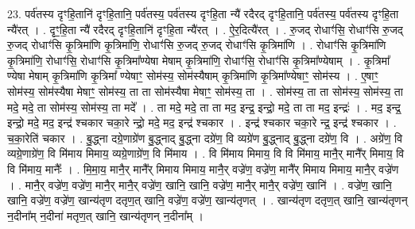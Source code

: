 \documentclass[17pt]{extarticle}
\begin{document}
23. पर्व॑तस्य दृꣳहि॒तानि॑ दृꣳहि॒तानि॒ पर्व॑तस्य॒ पर्व॑तस्य दृꣳहि॒ता न्यै॑ रदैरद् दृꣳहि॒तानि॒ पर्व॑तस्य॒ पर्व॑तस्य दृꣳहि॒ता न्यै॑रत् । . दृꣳ॒॒हि॒ता न्यै॑ रदैरद् दृꣳहि॒तानि॑ दृꣳहि॒ता न्यै॑रत् । . ऐ॒र॒दित्यै॑रत् । . रु॒जद् रोधाꣳ॑सि॒ रोधाꣳ॑सि रु॒जद् रु॒जद् रोधाꣳ॑सि कृ॒त्रिमा॑णि कृ॒त्रिमा॑णि॒ रोधाꣳ॑सि रु॒जद् रु॒जद् रोधाꣳ॑सि कृ॒त्रिमा॑णि । . रोधाꣳ॑सि कृ॒त्रिमा॑णि कृ॒त्रिमा॑णि॒ रोधाꣳ॑सि॒ रोधाꣳ॑सि कृ॒त्रिमा᳚ण्येषा मेषाम् कृ॒त्रिमा॑णि॒ रोधाꣳ॑सि॒ रोधाꣳ॑सि कृ॒त्रिमा᳚ण्येषाम् । . कृ॒त्रिमा᳚ ण्येषा मेषाम् कृ॒त्रिमा॑णि कृ॒त्रिमा᳚ ण्येषाꣳ॒॒ सोम॑स्य॒ सोम॑स्यैषाम् कृ॒त्रिमा॑णि कृ॒त्रिमा᳚ण्येषाꣳ॒॒ सोम॑स्य । . ए॒षाꣳ॒॒ सोम॑स्य॒ सोम॑स्यैषा मेषाꣳ॒॒ सोम॑स्य॒ ता ता सोम॑स्यैषा मेषाꣳ॒॒ सोम॑स्य॒ ता । . सोम॑स्य॒ ता ता सोम॑स्य॒ सोम॑स्य॒ ता मदे॒ मदे॒ ता सोम॑स्य॒ सोम॑स्य॒ ता मदे᳚ । . ता मदे॒ मदे॒ ता ता मद॒ इन्द्र॒ इन्द्रो॒ मदे॒ ता ता मद॒ इन्द्रः॑ । . मद॒ इन्द्र॒ इन्द्रो॒ मदे॒ मद॒ इन्द्र॑ श्चकार चका॒रे न्द्रो॒ मदे॒ मद॒ इन्द्र॑ श्चकार । . इन्द्र॑ श्चकार चका॒रे न्द्र॒ इन्द्र॑ श्चकार । . च॒का॒रेति॑ चकार । . बु॒द्ध्ना दग्रे॒णाग्रे॑ण बु॒द्ध्नाद् बु॒द्ध्ना दग्रे॑ण॒ वि व्यग्रे॑ण बु॒द्ध्नाद् बु॒द्ध्ना दग्रे॑ण॒ वि । . अग्रे॑ण॒ वि व्यग्रे॒णाग्रे॑ण॒ वि मि॑माय मिमाय॒ व्यग्रे॒णाग्रे॑ण॒ वि मि॑माय । . वि मि॑माय मिमाय॒ वि वि मि॑माय॒ मानै॒र् मानै᳚र् मिमाय॒ वि वि मि॑माय॒ मानैः᳚ । . मि॒मा॒य॒ मानै॒र् मानै᳚र् मिमाय मिमाय॒ मानै॒र् वज्रे॑ण॒ वज्रे॑ण॒ मानै᳚र् मिमाय मिमाय॒ मानै॒र् वज्रे॑ण । . मानै॒र् वज्रे॑ण॒ वज्रे॑ण॒ मानै॒र् मानै॒र् वज्रे॑ण॒ खानि॒ खानि॒ वज्रे॑ण॒ मानै॒र् मानै॒र् वज्रे॑ण॒ खानि॑ । . वज्रे॑ण॒ खानि॒ खानि॒ वज्रे॑ण॒ वज्रे॑ण॒ खान्य॑तृण दतृण॒त् खानि॒ वज्रे॑ण॒ वज्रे॑ण॒ खान्य॑तृणत् । . खान्य॑तृण दतृण॒त् खानि॒ खान्य॑तृणन् न॒दीना᳚म् न॒दीना॑ मतृण॒त् खानि॒ खान्य॑तृणन् न॒दीना᳚म् । \newline
\end{document}
